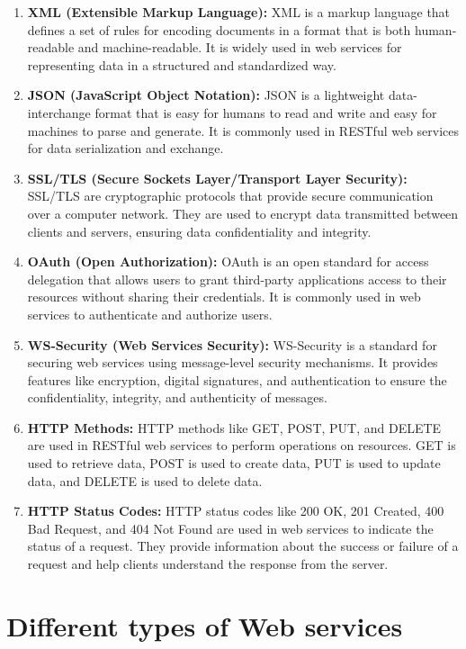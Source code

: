 \documentclass[11pt]{article}
\begin{document}
\begin{enumerate}
    \item \textbf{XML (Extensible Markup Language):} XML is a markup language that defines a set of rules for encoding documents in a format that is both human-readable and machine-readable. It is widely used in web services for representing data in a structured and standardized way.
    \item \textbf{JSON (JavaScript Object Notation):} JSON is a lightweight data-interchange format that is easy for humans to read and write and easy for machines to parse and generate. It is commonly used in RESTful web services for data serialization and exchange.
    \item \textbf{SSL/TLS (Secure Sockets Layer/Transport Layer Security):} SSL/TLS are cryptographic protocols that provide secure communication over a computer network. They are used to encrypt data transmitted between clients and servers, ensuring data confidentiality and integrity.
    \item \textbf{OAuth (Open Authorization):} OAuth is an open standard for access delegation that allows users to grant third-party applications access to their resources without sharing their credentials. It is commonly used in web services to authenticate and authorize users.
    \item \textbf{WS-Security (Web Services Security):} WS-Security is a standard for securing web services using message-level security mechanisms. It provides features like encryption, digital signatures, and authentication to ensure the confidentiality, integrity, and authenticity of messages.
    \item \textbf{HTTP Methods:} HTTP methods like GET, POST, PUT, and DELETE are used in RESTful web services to perform operations on resources. GET is used to retrieve data, POST is used to create data, PUT is used to update data, and DELETE is used to delete data.
    \item \textbf{HTTP Status Codes:} HTTP status codes like 200 OK, 201 Created, 400 Bad Request, and 404 Not Found are used in web services to indicate the status of a request. They provide information about the success or failure of a request and help clients understand the response from the server.
\end{enumerate}

\section{Different types of Web services}
\end{document}
